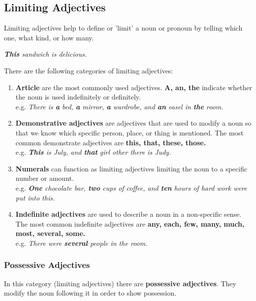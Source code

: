 \documentclass[hidelinks,10pt,a4paper]{article}
\begin{document}
\subsection{Limiting Adjectives}
Limiting adjectives help to define or 'limit' a noun or pronoun by telling which one, what kind, or how many.

\begin{center}
	\textit{\textbf{This} sandwich is delicious.}
\end{center}

There are the following categories of limiting adjectives:

\begin{enumerate}[label=(\alph*)]
	\item \textbf{Article}  are the most commonly used adjectives. \textbf{A, an, the} indicate whether the noun is used indefinitely or definitely. \\
		e.g. \textit{There is \textbf{a} bed, \textbf{a} mirror, \textbf{a} wardrobe, and \textbf{an} easel in \textbf{the} room.}
	\item \textbf{Demonstrative adjectives} are adjectives that are used to modify a noun so that we know which specific person, place, or thing is mentioned. The most common demonstrate adjectives are \textbf{this, that, these, those.} \\
		e.g. \textit{\textbf{This} is July, and \textbf{that} girl other there is Judy.}
	\item \textbf{Numerals} can function as limiting adjectives limiting the noun to a specific number or amount. \\
		e.g. \textit{\textbf{One} chocolate bar, \textbf{two} cups of coffee, and \textbf{ten} hours of hard work were put into this.}
	\item \textbf{Indefinite adjectives} are used to describe a noun in a non-specific sense. The most common indefinite adjectives are \textbf{any, each, few, many, much, most, several, some.}  \\
		e.g. \textit{There were \textbf{several} people in the room.}
\end{enumerate}


\subsubsection{Possessive Adjectives}
In this category (limiting adjectives) there are \textbf{possessive adjectives}. They modify the noun following it in order to show possession.
\end{document}
